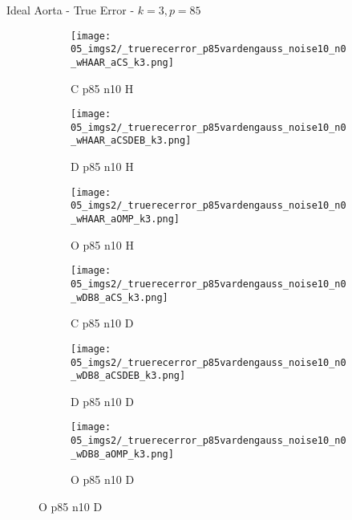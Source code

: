 \begin{frame}{Ideal Aorta - True Error - $k=3,p=85$}{}
\begin{figure}
\begin{subfigure}{0.13\textwidth}
\texttt{[image: 05\_imgs2/\_truerecerror\_p85vardengauss\_noise10\_n0\_wHAAR\_aCS\_k3.png]}
\caption*{\tiny C p85 n10 H}
\end{subfigure}
\begin{subfigure}{0.13\textwidth}
\texttt{[image: 05\_imgs2/\_truerecerror\_p85vardengauss\_noise10\_n0\_wHAAR\_aCSDEB\_k3.png]}
\caption*{\tiny D p85 n10 H}
\end{subfigure}
\begin{subfigure}{0.13\textwidth}
\texttt{[image: 05\_imgs2/\_truerecerror\_p85vardengauss\_noise10\_n0\_wHAAR\_aOMP\_k3.png]}
\caption*{\tiny O p85 n10 H}
\end{subfigure}
\begin{subfigure}{0.13\textwidth}
\texttt{[image: 05\_imgs2/\_truerecerror\_p85vardengauss\_noise10\_n0\_wDB8\_aCS\_k3.png]}
\caption*{\tiny C p85 n10 D}
\end{subfigure}
\begin{subfigure}{0.13\textwidth}
\texttt{[image: 05\_imgs2/\_truerecerror\_p85vardengauss\_noise10\_n0\_wDB8\_aCSDEB\_k3.png]}
\caption*{\tiny D p85 n10 D}
\end{subfigure}
\begin{subfigure}{0.13\textwidth}
\texttt{[image: 05\_imgs2/\_truerecerror\_p85vardengauss\_noise10\_n0\_wDB8\_aOMP\_k3.png]}
\caption*{\tiny O p85 n10 D}
\end{subfigure}

\vspace{5pt}


\end{figure}
\end{frame}
